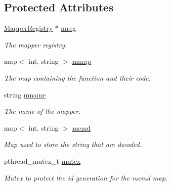 \subsection*{Protected Attributes}
\begin{DoxyCompactItemize}
\item 
\hypertarget{classMapper_a694827c3dd2b369e3fe5cce6945a46e6}{
\hyperlink{classMapperRegistry}{MapperRegistry} $\ast$ \hyperlink{classMapper_a694827c3dd2b369e3fe5cce6945a46e6}{mreg}}
\label{classMapper_a694827c3dd2b369e3fe5cce6945a46e6}

\begin{DoxyCompactList}\small\item\em The mapper registry. \item\end{DoxyCompactList}\item 
\hypertarget{classMapper_a2b545ffb6c51ba5e9cc40afc974557cd}{
map$<$ int, string $>$ \hyperlink{classMapper_a2b545ffb6c51ba5e9cc40afc974557cd}{mmap}}
\label{classMapper_a2b545ffb6c51ba5e9cc40afc974557cd}

\begin{DoxyCompactList}\small\item\em The map containing the function and their code. \item\end{DoxyCompactList}\item 
\hypertarget{classMapper_a4aca28f71e018f3d1aa7cd696dc4057e}{
string \hyperlink{classMapper_a4aca28f71e018f3d1aa7cd696dc4057e}{mname}}
\label{classMapper_a4aca28f71e018f3d1aa7cd696dc4057e}

\begin{DoxyCompactList}\small\item\em The name of the mapper. \item\end{DoxyCompactList}\item 
\hypertarget{classMapper_a3f193841d3eedb7adbf0a2be05f5e7c0}{
map$<$ int, string $>$ \hyperlink{classMapper_a3f193841d3eedb7adbf0a2be05f5e7c0}{mcmd}}
\label{classMapper_a3f193841d3eedb7adbf0a2be05f5e7c0}

\begin{DoxyCompactList}\small\item\em Map used to store the string that are decoded. \item\end{DoxyCompactList}\item 
\hypertarget{classMapper_a5a9ae264121a8706ee9f4954959ddd57}{
pthread\_\-mutex\_\-t \hyperlink{classMapper_a5a9ae264121a8706ee9f4954959ddd57}{mutex}}
\label{classMapper_a5a9ae264121a8706ee9f4954959ddd57}

\begin{DoxyCompactList}\small\item\em Mutex to protect the id generation for the mcmd map. \item\end{DoxyCompactList}\end{DoxyCompactItemize}


